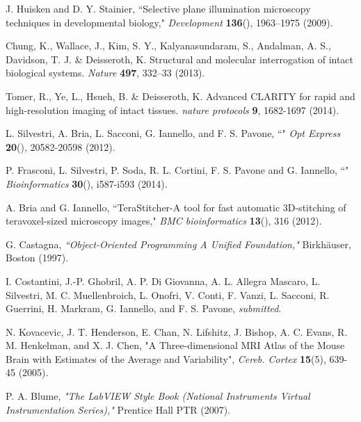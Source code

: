 \documentclass[12pt]{spieman}  %
\begin{document}
\begin{thebibliography}{0}

 J. Huisken and D. Y. Stainier, ``Selective plane illumination microscopy techniques in developmental biology," \emph{Development} \textbf{136}(), 1963–1975 (2009).

 Chung, K., Wallace, J., Kim, S. Y., Kalyanasundaram, S., Andalman, A. S., Davidson, T. J. \& Deisseroth, K. Structural and molecular interrogation of intact biological systems. \emph{Nature} \textbf{497}, 332–33 (2013).

 Tomer, R., Ye, L., Hsueh, B. \& Deisseroth, K. Advanced CLARITY for rapid and high-resolution imaging of intact tissues. \emph{nature protocols} \textbf{9}, 1682-1697 (2014).

 L. Silvestri, A. Bria, L. Sacconi, G. Iannello,  and F. S. Pavone,  ``" \emph{Opt Express} \textbf{20}(), 20582-20598 (2012).

 P. Frasconi, L. Silvestri, P. Soda, R. L. Cortini, F. S. Pavone and G. Iannello, ``" \emph{Bioinformatics} \textbf{30}(), i587-i593 (2014).

 A. Bria and G. Iannello,  ``TeraStitcher-A tool for fast automatic 3D-stitching of teravoxel-sized microscopy images,"  \emph{BMC bioinformatics} \textbf{13}(), 316 (2012).

 G. Castagna, \emph{``Object-Oriented Programming A Unified Foundation,"} Birkh{\"a}user, Boston (1997).

 I. Costantini, J.-P. Ghobril, A. P. Di Giovanna, A. L. Allegra Mascaro, L. Silvestri, M. C. Muellenbroich, L. Onofri, V. Conti, F. Vanzi, L. Sacconi, R. Guerrini, H. Markram, G. Iannello, and F. S. Pavone, \emph{submitted}.

 N. Kovacevic, J. T. Henderson, E. Chan, N. Lifshitz, J. Bishop, A. C. Evans, R. M. Henkelman, and X. J. Chen, "A Three-dimensional MRI Atlas of the Mouse Brain with Estimates of the Average and Variability", \emph{Cereb. Cortex} \textbf{15}(5), 639-45 (2005).

 P. A. Blume, \emph{"The LabVIEW Style Book (National Instruments Virtual Instrumentation Series),"} Prentice Hall PTR (2007).

\end{thebibliography}


\listoffigures



\listoftables

\end{document}
